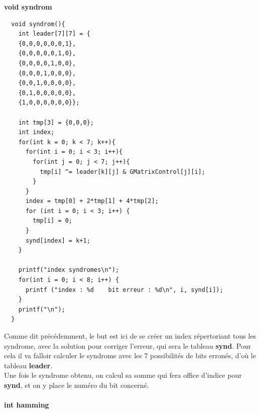 \documentclass[12pt]{article}
\begin{document}
\textbf{void syndrom}
\\
\begin{verbatim}
  void syndrom(){
    int leader[7][7] = {
    {0,0,0,0,0,0,1},
    {0,0,0,0,0,1,0},
    {0,0,0,0,1,0,0},
    {0,0,0,1,0,0,0},
    {0,0,1,0,0,0,0},
    {0,1,0,0,0,0,0},
    {1,0,0,0,0,0,0}};

    int tmp[3] = {0,0,0};
    int index;
    for(int k = 0; k < 7; k++){
      for(int i = 0; i < 3; i++){
        for(int j = 0; j < 7; j++){
          tmp[i] ^= leader[k][j] & GMatrixControl[j][i];
        }
      }
      index = tmp[0] + 2*tmp[1] + 4*tmp[2];
      for (int i = 0; i < 3; i++) {
        tmp[i] = 0;
      }
      synd[index] = k+1;
    }

    printf("index syndromes\n");
    for(int i = 0; i < 8; i++) {
      printf ("index : %d    bit erreur : %d\n", i, synd[i]);
    }
    printf("\n");
  }
\end{verbatim}
Comme dit précédemment, le but est ici de se créer un index répertoriant tous les syndrome, avec la solution pour corriger l’erreur, qui sera le tableau \textbf{synd}. Pour cela il va falloir calculer le syndrome avec les 7 possibilités de bits erronés, d’où le tableau \textbf{leader}.\\
Une fois le syndrome obtenu, on calcul sa somme qui fera office d’indice pour \textbf{synd}, et on y place le numéro du bit concerné.
\\
\\\textbf{int hamming}
\\
\end{document}
